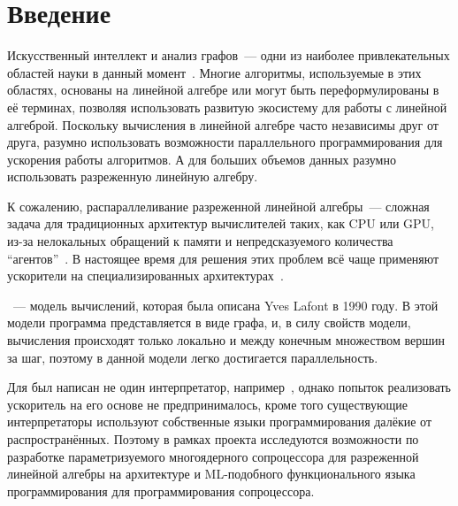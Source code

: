 

\section*{Введение}
\thispagestyle{withCompileDate}

Искусственный интеллект и анализ графов~--- одни из наиболее привлекательных областей науки в данный момент~\cite{chuiEconomicPotentialGenerative, garciaPathQueryingGraph2024a}.
Многие алгоритмы, используемые в этих областях, основаны на линейной алгебре или могут быть переформулированы в её терминах, позволяя использовать развитую экосистему для работы с линейной алгеброй.
Поскольку вычисления в линейной алгебре часто независимы друг от друга, разумно использовать возможности параллельного программирования для ускорения работы алгоритмов.
А для больших объемов данных разумно использовать разреженную линейную алгебру.

К сожалению, распараллеливание разреженной линейной алгебры~--- сложная задача для традиционных архитектур вычислителей таких, как CPU или GPU, из-за нелокальных обращений к памяти и непредсказуемого количества \enquote{агентов}~\cite{duHighPerformanceSparseLinear2022,isaac-chassandeDedicatedHardwareAccelerators2024,mohammedPerformanceEnhancementStrategies2022}.
В настоящее время для решения этих проблем всё чаще применяют ускорители на специализированных архитектурах~\cite{dakkakAcceleratingReductionScan2019, zhuMobileMachineLearning2018, jouppiInDatacenterPerformanceAnalysis2017, akkadEmbeddedDeepLearning2024, silvanoSurveyDeepLearning2024}.

\INs{}~--- модель вычислений, которая была описана Yves Lafont в 1990 году.
В этой модели программа представляется в виде графа, и, в силу свойств модели, вычисления происходят только локально и между конечным множеством вершин за шаг, поэтому в данной модели легко достигается параллельность.

Для \INs{} был написан не один интерпретатор, например~\cite{mackieParallelEvaluationInteraction2016, salikhmetovTokenpassingOptimalReduction2016a}, однако попыток реализовать ускоритель на его основе не предпринималось, кроме того существующие интерпретаторы используют собственные языки программирования далёкие от распространённых.
Поэтому в рамках проекта \Lamagraph{} исследуются возможности по разработке параметризуемого многоядерного сопроцессора для разреженной линейной алгебры на архитектуре \INs{} и ML-подобного функционального языка программирования для программирования сопроцессора.

